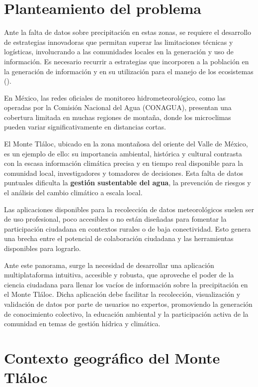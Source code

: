 \section{Planteamiento del problema}

Ante la falta de datos sobre precipitación en estas zonas, se requiere el desarrollo de estrategias innovadoras que permitan superar las limitaciones técnicas y logísticas, involucrando a las comunidades locales en la generación y uso de información. Es necesario recurrir a estrategias que incorporen a la población en la generación de información y en su utilización para el manejo de los ecosistemas (\cite{hubp1990}).


En México, las redes oficiales de monitoreo hidrometeorológico, como las operadas por la Comisión Nacional del Agua (CONAGUA), presentan una cobertura limitada en muchas regiones de montaña, donde los microclimas pueden variar significativamente en distancias cortas. %


El Monte Tláloc, ubicado en la zona montañosa del oriente del Valle de México, es un ejemplo de ello: su importancia ambiental, histórica y cultural contrasta con la escasa información climática precisa y en tiempo real disponible para la comunidad local, investigadores y tomadores de decisiones. Esta falta de datos puntuales dificulta la \textbf{gestión sustentable del agua}, la prevención de riesgos y el análisis del cambio climático a escala local.

Las aplicaciones disponibles para la recolección de datos meteorológicos suelen ser de uso profesional, poco accesibles o no están diseñadas para fomentar la participación ciudadana en contextos rurales o de baja conectividad. Esto genera una brecha entre el potencial de colaboración ciudadana y las herramientas disponibles para lograrlo.

Ante este panorama, surge la necesidad de desarrollar una aplicación multiplataforma intuitiva, accesible y robusta, que aproveche el poder de la ciencia ciudadana para llenar los vacíos de información sobre la precipitación en el Monte Tláloc. Dicha aplicación debe facilitar la recolección, visualización y validación de datos por parte de usuarios no expertos, promoviendo la generación de conocimiento colectivo, la educación ambiental y la participación activa de la comunidad en temas de gestión hídrica y climática.

 
\section{Contexto geográfico del Monte Tláloc}


